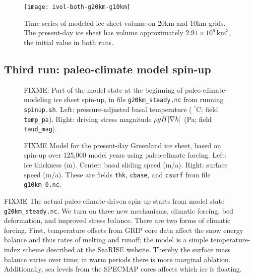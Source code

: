 \begin{figure}[ht]
\centering
\texttt{[image: ivol-both-g20km-g10km]}
\caption{Time series of modeled ice sheet volume on 20km and 10km grids.  The present-day ice sheet has volume approximately $2.91\times 10^6\,\text{km}^3$, the initial value in both runs.}
\label{fig:ivolboth}
\end{figure}


\subsection{Third run: paleo-climate model spin-up}  \label{subsect:paleorun}  


\begin{figure}[ht]
\centering
\caption{FIXME: Part of the model state at the beginning of paleo-climate-modeling ice sheet spin-up, in file \texttt{g20km_steady.nc} from running \texttt{spinup.sh}.  Left: pressure-adjusted basal temperature ($\phantom{|}^\circ$C; field \texttt{temp_pa}).  Right: driving stress magnitude $\rho g H |\nabla h|$ (Pa; field \texttt{taud_mag}).}
\label{fig:sr-spinstart}
\end{figure}


\begin{figure}[ht]
\centering
\caption{FIXME Model for the present-day Greenland ice sheet, based on spin-up over 125,000 model years using paleo-climate forcing.  Left: ice thickness (m).  Center: basal sliding speed (m/a).  Right: surface speed (m/a).  These are fields \texttt{thk}, \texttt{cbase}, and \texttt{csurf} from file \texttt{g10km_0.nc}.}
\label{fig:sr-spindone-map}
\end{figure}

FIXME The actual paleo-climate-driven spin-up starts from model state \texttt{g20km_steady.nc}.  We turn on three new mechanisms, climatic forcing, bed deformation, and improved stress balance.  There are two forms of climatic forcing. First, temperature offsets from GRIP core data affect the snow energy balance and thus rates of melting and runoff; the model is a simple temperature-index scheme described at the SeaRISE website.  Thereby the surface mass balance varies over time; in warm periods there is more marginal ablation.  Additionally, sea levels from the SPECMAP cores affects which ice is floating.

